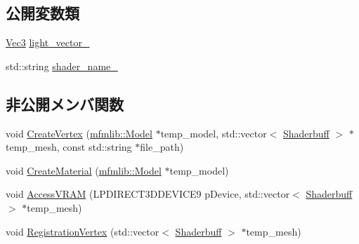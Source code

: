 \subsection*{公開変数類}
\begin{DoxyCompactItemize}
\item 
\mbox{\hyperlink{_vector3_d_8h_ab16f59e4393f29a01ec8b9bbbabbe65d}{Vec3}} \mbox{\hyperlink{class_model_f_b_x_object_a9d7b849ac816b7e5841d54a4b75216a9}{light\+\_\+vector\+\_\+}}
\item 
std\+::string \mbox{\hyperlink{class_model_f_b_x_object_a9a1728e6b2d5f1a49b26c1aaf75049f0}{shader\+\_\+name\+\_\+}}
\end{DoxyCompactItemize}
\subsection*{非公開メンバ関数}
\begin{DoxyCompactItemize}
\item 
void \mbox{\hyperlink{class_model_f_b_x_object_a962ffe35009b920c09e2aaa3154051e4}{Create\+Vertex}} (\mbox{\hyperlink{classmfmlib_1_1_model}{mfmlib\+::\+Model}} $\ast$temp\+\_\+model, std\+::vector$<$ \mbox{\hyperlink{struct_model_f_b_x_object_1_1_shaderbuff}{Shaderbuff}} $>$ $\ast$temp\+\_\+mesh, const std\+::string $\ast$file\+\_\+path)
\item 
void \mbox{\hyperlink{class_model_f_b_x_object_a3fba4178f5a21dd3c180cb16f0a05106}{Create\+Material}} (\mbox{\hyperlink{classmfmlib_1_1_model}{mfmlib\+::\+Model}} $\ast$temp\+\_\+model)
\item 
void \mbox{\hyperlink{class_model_f_b_x_object_a930e90d4107466549946b1f318857954}{Access\+V\+R\+AM}} (L\+P\+D\+I\+R\+E\+C\+T3\+D\+D\+E\+V\+I\+C\+E9 p\+Device, std\+::vector$<$ \mbox{\hyperlink{struct_model_f_b_x_object_1_1_shaderbuff}{Shaderbuff}} $>$ $\ast$temp\+\_\+mesh)
\item 
void \mbox{\hyperlink{class_model_f_b_x_object_aa74ce889c6840f2a9d0fa54b420b9e2d}{Registration\+Vertex}} (std\+::vector$<$ \mbox{\hyperlink{struct_model_f_b_x_object_1_1_shaderbuff}{Shaderbuff}} $>$ $\ast$temp\+\_\+mesh)
\end{DoxyCompactItemize}
